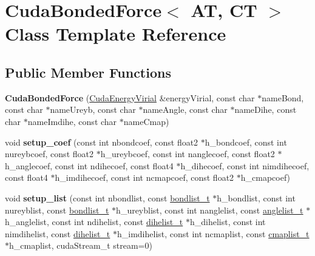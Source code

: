 \hypertarget{classCudaBondedForce}{}\section{Cuda\+Bonded\+Force$<$ AT, CT $>$ Class Template Reference}
\label{classCudaBondedForce}
\subsection*{Public Member Functions}
\begin{DoxyCompactItemize}
\item 
\hypertarget{classCudaBondedForce_a187a309ec2cff80cde58651b6b7027f9}{}\label{classCudaBondedForce_a187a309ec2cff80cde58651b6b7027f9} 
{\bfseries Cuda\+Bonded\+Force} (\hyperlink{classCudaEnergyVirial}{Cuda\+Energy\+Virial} \&energy\+Virial, const char $\ast$name\+Bond, const char $\ast$name\+Ureyb, const char $\ast$name\+Angle, const char $\ast$name\+Dihe, const char $\ast$name\+Imdihe, const char $\ast$name\+Cmap)
\item 
\hypertarget{classCudaBondedForce_afbb956ecfefba60abf39ee5f918826e8}{}\label{classCudaBondedForce_afbb956ecfefba60abf39ee5f918826e8} 
void {\bfseries setup\+\_\+coef} (const int nbondcoef, const float2 $\ast$h\+\_\+bondcoef, const int nureybcoef, const float2 $\ast$h\+\_\+ureybcoef, const int nanglecoef, const float2 $\ast$h\+\_\+anglecoef, const int ndihecoef, const float4 $\ast$h\+\_\+dihecoef, const int nimdihecoef, const float4 $\ast$h\+\_\+imdihecoef, const int ncmapcoef, const float2 $\ast$h\+\_\+cmapcoef)
\item 
\hypertarget{classCudaBondedForce_a41719ddc963ea1ef2da1fc4e174c4b95}{}\label{classCudaBondedForce_a41719ddc963ea1ef2da1fc4e174c4b95} 
void {\bfseries setup\+\_\+list} (const int nbondlist, const \hyperlink{structbondlist__t}{bondlist\+\_\+t} $\ast$h\+\_\+bondlist, const int nureyblist, const \hyperlink{structbondlist__t}{bondlist\+\_\+t} $\ast$h\+\_\+ureyblist, const int nanglelist, const \hyperlink{structanglelist__t}{anglelist\+\_\+t} $\ast$h\+\_\+anglelist, const int ndihelist, const \hyperlink{structdihelist__t}{dihelist\+\_\+t} $\ast$h\+\_\+dihelist, const int nimdihelist, const \hyperlink{structdihelist__t}{dihelist\+\_\+t} $\ast$h\+\_\+imdihelist, const int ncmaplist, const \hyperlink{structcmaplist__t}{cmaplist\+\_\+t} $\ast$h\+\_\+cmaplist, cuda\+Stream\+\_\+t stream=0)
\item 
\hypertarget{classCudaBondedForce_a2cb00b3eb0621b031c69db4afdd35371}{}\label{classCudaBondedForce_a2cb00b3eb0621b031c69db4afdd35371} 

\end{DoxyCompactItemize}
